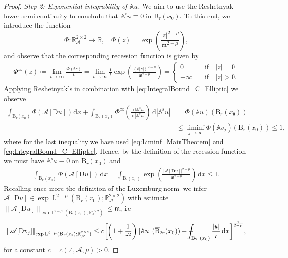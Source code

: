\documentclass[a4paper,10pt,reqno,oneside]{amsart}
\numberwithin{equation}{section}
\newcommand{\R}{\mathbb R}
\newcommand{\ball}{\mathrm{B}}
\newcommand{\A}{\mathscr{A}}
\newcommand{\Aop}{\mathbb{A}}
\newcommand{\lebe}{\operatorname{L}}
\newcommand{\D}{\mathrm{D}}
\newcommand{\dx}[1]{\,\mathrm{d}#1}
\newcommand{\abs}[1]{\left\lvert#1\right\rvert}
\renewcommand{\L}{\mathrm{L}}
\def\Xint#1{\mathchoice
	{\XXint\displaystyle\textstyle{#1}}%
	{\XXint\textstyle\scriptstyle{#1}}%
	{\XXint\scriptstyle\scriptscriptstyle{#1}}%
	{\XXint\scriptscriptstyle\scriptscriptstyle{#1}}%
	\!\int}
\def\XXint#1#2#3{{\setbox0=\hbox{$#1{#2#3}{\int}$ }
		\vcenter{\hbox{$#2#3$ }}\kern-.6\wd0}}
\def\dashint{\Xint-}
\begin{document}
\begin{proof}
	\textit{Step 2: Exponential integrability of $\Aop u$.}
	We aim to use the Reshetnyak lower semi-continuity  to conclude that $\Aop^s u\equiv 0$ in $\ball_{r}(x_0)$. To this end, we introduce the function 
	\begin{equation*}
		\Phi\colon\R^{2\times 2}_\A\to\R, \quad \Phi(z) = \exp\left(\frac{\abs{z}^{2-\mu}}{\mathfrak{m}^{2-\mu}}\right),
	\end{equation*}
	and observe that the corresponding recession function is given by
	\begin{align*}
		\Phi^\infty(z) \coloneqq \lim_{t\to\infty} \frac{\Phi(tz)}{t} 
		= \lim_{t\to\infty} \frac1t\exp\left(\frac{(t\abs{z})^{2-\mu}}{\mathfrak{m}^{2-\mu}}\right)
		=
		\begin{cases}
			0\quad&\mbox{if}\quad \abs{z}=0\\
			+\infty\quad&\mbox{if}\quad\abs{z}>0.
		\end{cases}
	\end{align*}
	Applying Reshetnyak's  in combination with \eqref{eq:IntegralBound_C_Elliptic} we observe
	\begin{align*}
		\int_{\ball_{r}(x_0)} \Phi(\A [\D u])\dx{x} + \int_{\ball_r(x_0)} \Phi^\infty\left(\frac{\dx{\Aop^s u}}{\dx{\abs{\Aop^s u}}}\right) \dx{\abs{\Aop^s u}} &= \Phi(\Aop u)(\ball_r(x_0))\\
		&\leq \liminf_{j\to\infty} \Phi(\Aop v_j)(\ball_r(x_0))\leq 1,
	\end{align*}
	where for the last inequality we have used \eqref{eq:Liminf_MainTheorem} and \eqref{eq:IntegralBound_C_Elliptic}. 
	Hence, by the definition of the recession function we must have $\Aop^s u\equiv 0$ on $\ball_r(x_0)$ and 
	\begin{align*}
		\int_{\ball_r(x_0)}\Phi(\A[\D u] )\dx{x}=\int_{\ball_r(x_0)} \exp\left(\frac{\abs{\A[\D u]}^{2-\mu}}{\mathfrak{m}^{2-\mu}}\right)\dx{x}\leq 1.  
	\end{align*}
	Recalling once more the definition of the Luxemburg norm, we infer $\A[\D u] \in\exp\lebe^{2-\mu}(\ball_r(x_0);\R^{2\times 2}_\A)$ with estimate $\|\A[\D u]\|_{\exp\lebe^{2-\mu}(\ball_r(x_0);\R^{2\times 2}_\A)}\leq \mathfrak{m}$, i.e
	\begin{equation}
		\|\A[\D v_j]\|_{\exp\L^{2-\mu}(\ball_r(x_0);\R^{2\times 2}_{\A})} \leq c \bigg[\bigg(1+\frac{1}{r^2}\bigg) \abs{\Aop u}(\overline{\ball}_{2r}(x_0))+ \dashint_{\ball_{2r}(x_0)}\frac{\abs{u}}{r}\dx{x}\bigg]^{\frac{1}{2-\mu}},
	\end{equation}
	for a constant $c=c(\Lambda,\A,\mu)>0$. 
	

\end{proof}
\end{document}
